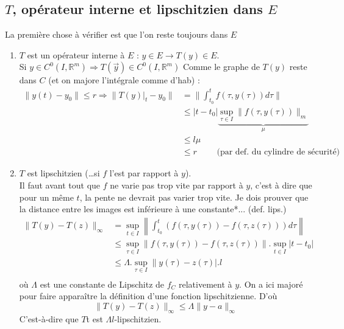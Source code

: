 \subsection{$T$, opérateur interne et lipschitzien dans $E$}
La première chose à vérifier est que l'on reste toujours dans $E$
\begin{enumerate}
	\item $T$ est un opérateur interne à $E$ : $y\in E \rightarrow T(y) \in E$.\\
	      Si $y \in C^0(I,\mathbb{R}^m) \Longrightarrow T(\vec{y}) \in C^0(I,\mathbb{R}^m)$
	      Comme le graphe de $T(y)$ reste dans $C$ (et on majore l'intégrale comme d'hab) :
	      \begin{equation}
	      	\begin{array}{ll}
	      		\|y(t)-y_0\| \leq r \Longrightarrow \|T(y)|_t - y_0\| & = \|\int_{t_0}^t f(\tau,y(                                                
	      		\tau))d\tau\| \\
	      		                                                      & \leq |t-t_0| \underbrace{\sup_{\tau \in I} \|f(\tau, y(\tau)) \|_m}_{\mu} \\
	      		                                                      & \leq l\mu                                                                 \\
	      		                                                      & \leq r\qquad \text{ (par def. du cylindre de sécurité)}                 
	      	\end{array}
	      \end{equation}
	      	
	\item $T$ est lipschitzien (\dots si $f$ l'est par rapport à $y$).\\
	      Il faut avant tout que $f$ ne varie pas trop vite par rapport à $y$, c'est à dire 
	      que pour un même $t$, la pente ne devrait pas varier trop vite.  Je dois prouver 
	      que la distance entre les images est inférieure à une constante*... (def. lips.)
	      \begin{equation}
	      	\begin{array}{ll}
	      		\| T(y) - T(z)\|_\infty & = \sup_{t\in I} \left\|\int_{t_0}^t(f(\tau,y(\tau))-f(\tau,                   
	      		z(\tau)))d\tau\right\|\\
	      		                        & \leq \sup_{\tau\in I}\|f(\tau,y(\tau))-f(\tau,z(\tau))\|.\sup_{t\in I}|t-t_0| \\
	      		                        & \leq \Lambda.\sup_{\tau\in I}\|y(\tau)-z(\tau)|.l                             \\	 
	      	\end{array}
	      \end{equation}
	      où $\Lambda$ est une constante de Lipschitz de $f_C$ relativement à $y$. On a ici 
	      majoré pour faire apparaître la définition d'une fonction lipschitzienne. D'où
	      \begin{equation}
	      	\|T(y)-T(z)\|_\infty \leq \Lambda \|y-a\|_\infty
	      \end{equation}
	      C'est-à-dire que $T$t est $\Lambda l$-lipschitzien.
\end{enumerate}
	
